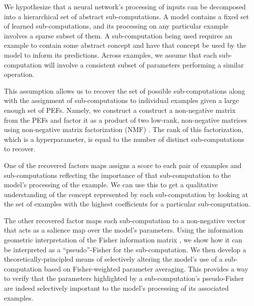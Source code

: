 \documentclass[dvipsnames]{article}
\begin{document}


We hypothesize that a neural network's processing of inputs can be decomposed into a hierarchical set of abstract sub-computations.
A model contains a fixed set of learned sub-computations, and its processing on any particular example involves a sparse subset of them.
A sub-computation being used requires an example to contain some abstract concept and have that concept be used by the model to inform its predictions.
Across examples, we assume that each sub-computation will involve a consistent subset of parameters performing a similar operation.

This assumption allows us to recover the set of possible sub-computations along with the assignment of sub-computations to individual examples given a large enough set of PEFs.
Namely, we construct a construct a non-negative matrix from the PEFs and factor it as a product of two low-rank, non-negative matrices using non-negative matrix factorization (NMF) \citep{lee1999learning}.
The rank of this factorization, which is a hyperparameter, is equal to the number of distinct sub-computations to recover.

One of the recovered factors maps assigns a score to each pair of examples and sub-computations reflecting the importance of that sub-computation to the model's processing of the example.
We can use this to get a qualitative understanding of the concept represented by each sub-computation by looking at the set of examples with the highest coefficients for a particular sub-computation.

The other recovered factor maps each sub-computation to a non-negative vector that acts as a salience map over the model's parameters.
Using the information geometric interpretation of the Fisher information matrix \citep{amari2016information}, we show how it can be interpreted as a ``pseudo''-Fisher for the sub-computation.
We then develop a theoretically-principled means of selectively altering the model's use of a sub-computation based on Fisher-weighted parameter averaging.
This provides a way to verify that the parameters highlighted by a sub-computation's pseudo-Fisher are indeed selectively important to the model's processing of its associated examples.
\end{document}
